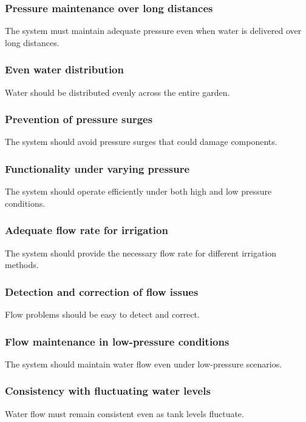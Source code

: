\documentclass[12pt]{report}
\begin{document}
\subsubsection{Pressure maintenance over long distances}
The system must maintain adequate pressure even when water is delivered over long distances.

\subsubsection{Even water distribution}
Water should be distributed evenly across the entire garden.

\subsubsection{Prevention of pressure surges}
The system should avoid pressure surges that could damage components.

\subsubsection{Functionality under varying pressure}
The system should operate efficiently under both high and low pressure conditions.

\subsubsection{Adequate flow rate for irrigation}
The system should provide the necessary flow rate for different irrigation methods.

\subsubsection{Detection and correction of flow issues}
Flow problems should be easy to detect and correct.

\subsubsection{Flow maintenance in low-pressure conditions}
The system should maintain water flow even under low-pressure scenarios.

\subsubsection{Consistency with fluctuating water levels}
Water flow must remain consistent even as tank levels fluctuate.
\end{document}
